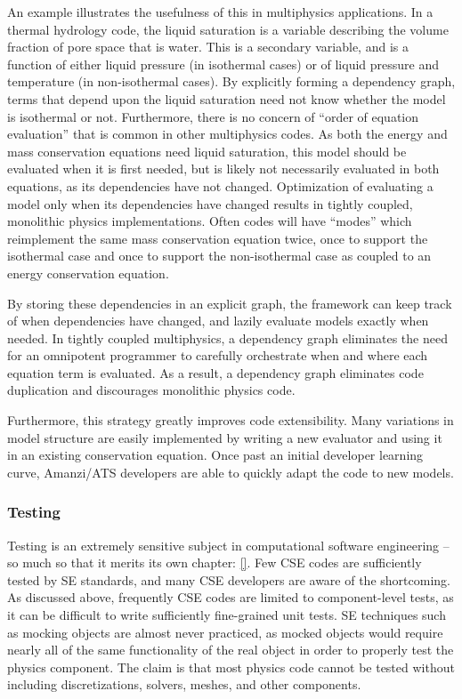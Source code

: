 An example illustrates the usefulness of this in multiphysics applications.
In a thermal hydrology code, the liquid saturation is a variable describing the volume fraction of pore space that is water.
This is a secondary variable, and is a function of either liquid pressure (in isothermal cases) or of liquid pressure and temperature (in non-isothermal cases).
By explicitly forming a dependency graph, terms that depend upon the liquid saturation need not know whether the model is isothermal or not.
Furthermore, there is no concern of ``order of equation evaluation'' that is common in other multiphysics codes.
As both the energy and mass conservation equations need liquid saturation, this model should be evaluated when it is first needed, but is likely not necessarily evaluated in both equations, as its dependencies have not changed.
Optimization of evaluating a model only when its dependencies have changed results in tightly coupled, monolithic physics implementations.
Often codes will have ``modes'' which reimplement the same mass conservation equation twice, once to support the isothermal case and once to support the non-isothermal case as coupled to an energy conservation equation.

By storing these dependencies in an explicit graph, the framework can keep track of when dependencies have changed, and lazily evaluate models exactly when needed.
In tightly coupled multiphysics, a dependency graph eliminates the need for an omnipotent programmer to carefully orchestrate when and where each equation term is evaluated.
As a result, a dependency graph eliminates code duplication and discourages monolithic physics code.

Furthermore, this strategy greatly improves code extensibility.
Many variations in model structure are easily implemented by writing a new evaluator and using it in an existing conservation equation.
Once past an initial developer learning curve, Amanzi/ATS developers are able to quickly adapt the code to new models.

\subsubsection{Testing}
\label{sec:amanzi:testing}
%
Testing is an extremely sensitive subject in computational software engineering -- so much so that it merits its own chapter: \ref{}.
Few CSE codes are sufficiently tested by SE standards, and many CSE developers are aware of the shortcoming.
As discussed above, frequently CSE codes are limited to component-level tests, as it can be difficult to write sufficiently fine-grained unit tests.
SE techniques such as mocking objects are almost never practiced, as mocked objects would require nearly all of the same functionality of the real object in order to properly test the physics component.
The claim is that most physics code cannot be tested without including discretizations, solvers, meshes, and other components.

